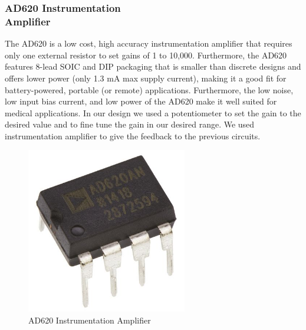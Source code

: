 \documentclass[a4paper,12pt]{article}
\begin{document}
\begin{multicols}{2}
\subsubsection{AD620 Instrumentation\\Amplifier}
The AD620 is a low cost, high accuracy instrumentation amplifier that requires only one external resistor to set gains of 1 to 10,000. Furthermore, the AD620 features 8-lead SOIC and DIP packaging that is smaller than discrete designs and offers lower power (only 1.3 mA max supply current), making it a good fit for battery-powered, portable (or remote) applications. Furthermore, the low noise, low input bias current, and low power of the AD620 make it well suited for medical applications. In our design we used a potentiometer to set the gain to the desired value and to fine tune the gain in our desired range. We used instrumentation amplifier to give the feedback to the previous circuits.
\begin{figure}[H]
    \centering
    \includegraphics[width=7cm]{AD620.jpg}
    \caption{AD620 Instrumentation Amplifier}
    \label{fig:AD620}
\end{figure}

\end{multicols}
\end{document}

